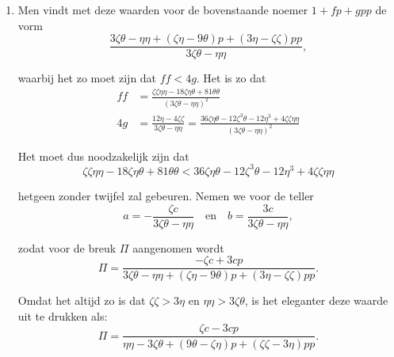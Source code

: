 \documentclass[10pt,a4paper]{article}
\newcommand{\switchenum}{\setcounter{enumi}{\arabic{enumi}-1}\switchcolumn}
\begin{document}
\begin{paracol}{2}
\begin{enumerate}[topsep=1px]
		\switchenum
		\item Men vindt met deze waarden voor de bovenstaande noemer $1+fp+gpp$ de vorm
		\[
			\frac{3\zeta \theta - \eta \eta + (\zeta \eta - 9\theta)p + (3\eta -\zeta \zeta)pp}{3\zeta \theta - \eta \eta},
		\]
		\par waarbij het zo moet zijn dat $ff< 4g$. Het is zo dat
		\begin{align*}
			ff &= \frac{\zeta \zeta \eta \eta -18\zeta \eta \theta + 81 \theta \theta}{(3\zeta \theta - \eta \eta)^2}\\
			4g &= \frac{12\eta - 4\zeta \zeta }{3\zeta \theta-\eta \eta} = \frac{36\zeta \eta \theta - 12 \zeta ^3\theta - 12 \eta^3+4\zeta \zeta \eta \eta}{(3\zeta \theta - \eta \eta)^2}
		\end{align*}
		\par Het moet dus noodzakelijk zijn dat
		\[
			\zeta \zeta \eta \eta -18 \zeta \eta \theta +81 \theta \theta < 36 \zeta \eta \theta - 12 \zeta^3\theta -12\eta^3 + 4 \zeta \zeta \eta \eta
		\]
		\par hetgeen zonder twijfel zal gebeuren. Nemen we voor de teller
		\[
			a = - \frac{\zeta c}{3\zeta \theta - \eta \eta} \quad \text{en}\quad b = \frac{3c}{3\zeta \theta - \eta \eta},
		\]
		\par zodat voor de breuk $\Pi$ aangenomen wordt
		\[
			\Pi = \frac{-\zeta c + 3cp}{3\zeta \theta -\eta \eta +(\zeta \eta - 9\theta)p+(3\eta - \zeta \zeta)pp}.
		\]
		\par Omdat het altijd zo is dat $\zeta \zeta > 3\eta$ en $\eta \eta > 3\zeta \theta$, is het eleganter deze waarde uit te drukken als:
		\[
			\Pi = \frac{\zeta c - 3cp }{\eta \eta - 3\zeta \theta +(9\theta - \zeta \eta)p + (\zeta \zeta - 3\eta)pp}.
		\]

		
		\switchcolumn*
		

\end{enumerate}
\end{paracol}
\end{document}
